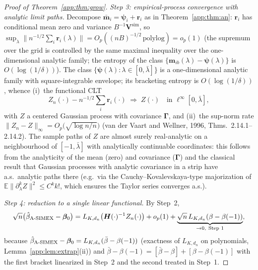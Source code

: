 \documentclass[11pt]{article}
\theoremstyle{plain}
\theoremstyle{definition}
\newcommand{\E}{\mathbb{E}}
\newcommand{\bet}{\bm{\beta}}
\newcommand{\btV}{\bm{V}}
\newcommand{\asimex}{\textup{A-SIMEX}}
\begin{document}
\begin{proof}[Proof of Theorem~\ref{app:thm:grow}]
\emph{Step 3: empirical-process convergence with analytic limit paths.}
Decompose $\bar{\bm m}_i=\bm\psi_i+\bm r_i$ as in
Theorem~\ref{app:thm:an}: $\bm r_i$ has conditional mean zero and variance
$B^{-1}\btV^{\mathrm{sim}}$, so
$\sup_\lambda\|n^{-1/2}\sum_i\bm r_i(\lambda)\|
=O_p((nB)^{-1/2}\,\mathrm{polylog})=o_p(1)$
(the supremum over the grid is controlled by the same maximal
inequality over the one-dimensional analytic family; the entropy of the
class $\{\bm m_{ib}(\lambda)-\bm\psi(\lambda)\}$ is
$O(\log(1/\delta))$). The class
$\{\bm\psi(\lambda):\lambda\in[0,\bar\lambda]\}$ is a one-dimensional
analytic family with square-integrable envelope; its bracketing entropy
is $O(\log(1/\delta))$, whence (i)~the functional CLT
\[
  Z_n(\cdot)-n^{-1/2}\textstyle\sum_i\bm r_i(\cdot)
  \;\Rightarrow\;Z(\cdot)\quad\text{in }\ell^\infty[0,\bar\lambda],
\]
with $Z$ a centered Gaussian process with covariance $\bm\Gamma$, and
(ii)~the sup-norm rate
$\|Z_n-Z\|_\infty=O_p\bigl(\sqrt{\log n/n}\bigr)$
(van der Vaart and Wellner, 1996, Thms.~2.14.1--2.14.2). The
sample paths of $Z$ are almost surely real-analytic on a neighbourhood
of $[-1,\bar\lambda]$ with analytically continuable coordinates: this
follows from the analyticity of the mean (zero) and covariance
($\bm\Gamma$) and the classical result that Gaussian processes with
analytic covariance in a strip have a.s.\ analytic paths there
(e.g.\ via the Cauchy--Kovalevskaya-type majorization of
$\E\|\partial_\lambda^k Z\|^2\le C^k k!$, which ensures the Taylor
series converges a.s.).

\emph{Step 4: reduction to a single linear functional.} By Step~2,
\[
  \sqrt n\bigl(\hat\beta_{\asimex}-\bet_0\bigr)
  =L_{K,d_n}\bigl(\bm H(\cdot)^{-1}Z_n(\cdot)\bigr)
   +o_p(1)+\underbrace{\sqrt n\,L_{K,d_n}(\beta-\beta(-1))}_{\to0,\ \text{Step 1}},
\]
because $\hat\beta_{\asimex}-\bet_0=L_{K,d_n}(\bar\beta-\beta(-1))$
(exactness of $L_{K,d_n}$ on polynomials, Lemma~\ref{app:lem:extrap}(ii))
and $\bar\beta-\beta(-1)=[\bar\beta-\beta]+[\beta-\beta(-1)]$ with the
first bracket linearized in Step~2 and the second treated in Step~1.


\end{proof}
\end{document}
